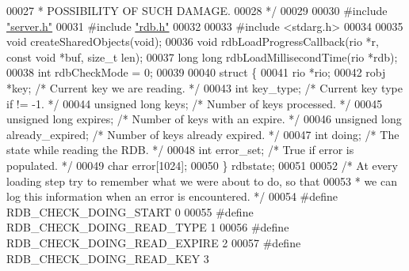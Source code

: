 \begin{DoxyCode}
00027 \textcolor{comment}{ * POSSIBILITY OF SUCH DAMAGE.}
00028 \textcolor{comment}{ */}
00029 
00030 \textcolor{preprocessor}{#}\textcolor{preprocessor}{include} \hyperlink{server_8h}{"server.h"}
00031 \textcolor{preprocessor}{#}\textcolor{preprocessor}{include} \hyperlink{rdb_8h}{"rdb.h"}
00032 
00033 \textcolor{preprocessor}{#}\textcolor{preprocessor}{include} \textcolor{preprocessor}{<}\textcolor{preprocessor}{stdarg}\textcolor{preprocessor}{.}\textcolor{preprocessor}{h}\textcolor{preprocessor}{>}
00034 
00035 \textcolor{keywordtype}{void} createSharedObjects(\textcolor{keywordtype}{void});
00036 \textcolor{keywordtype}{void} rdbLoadProgressCallback(rio *r, \textcolor{keyword}{const} \textcolor{keywordtype}{void} *buf, size\_t len);
00037 \textcolor{keywordtype}{long} \textcolor{keywordtype}{long} rdbLoadMillisecondTime(rio *rdb);
00038 \textcolor{keywordtype}{int} rdbCheckMode = 0;
00039 
00040 \textcolor{keyword}{struct} \{
00041     rio *rio;
00042     robj *key;                      \textcolor{comment}{/* Current key we are reading. */}
00043     \textcolor{keywordtype}{int} key\_type;                   \textcolor{comment}{/* Current key type if != -1. */}
00044     \textcolor{keywordtype}{unsigned} \textcolor{keywordtype}{long} keys;             \textcolor{comment}{/* Number of keys processed. */}
00045     \textcolor{keywordtype}{unsigned} \textcolor{keywordtype}{long} expires;          \textcolor{comment}{/* Number of keys with an expire. */}
00046     \textcolor{keywordtype}{unsigned} \textcolor{keywordtype}{long} already\_expired;  \textcolor{comment}{/* Number of keys already expired. */}
00047     \textcolor{keywordtype}{int} doing;                      \textcolor{comment}{/* The state while reading the RDB. */}
00048     \textcolor{keywordtype}{int} error\_set;                  \textcolor{comment}{/* True if error is populated. */}
00049     \textcolor{keywordtype}{char} error[1024];
00050 \} rdbstate;
00051 
00052 \textcolor{comment}{/* At every loading step try to remember what we were about to do, so that}
00053 \textcolor{comment}{ * we can log this information when an error is encountered. */}
00054 \textcolor{preprocessor}{#}\textcolor{preprocessor}{define} \textcolor{preprocessor}{RDB\_CHECK\_DOING\_START} 0
00055 \textcolor{preprocessor}{#}\textcolor{preprocessor}{define} \textcolor{preprocessor}{RDB\_CHECK\_DOING\_READ\_TYPE} 1
00056 \textcolor{preprocessor}{#}\textcolor{preprocessor}{define} \textcolor{preprocessor}{RDB\_CHECK\_DOING\_READ\_EXPIRE} 2
00057 \textcolor{preprocessor}{#}\textcolor{preprocessor}{define} \textcolor{preprocessor}{RDB\_CHECK\_DOING\_READ\_KEY} 3

\end{DoxyCode}
